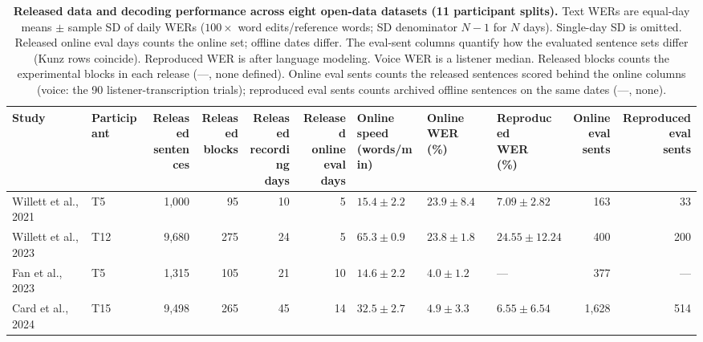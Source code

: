 \documentclass[11pt]{article}
\begin{document}
\begin{table}[t]
\centering
\footnotesize
\setlength{\tabcolsep}{3pt}
\renewcommand{\arraystretch}{1.12}
\caption{\textbf{Released data and decoding performance across eight
open-data datasets (11 participant splits).}
Text WERs are equal-day means $\pm$ sample SD of daily WERs
($100\times$ word edits/reference words; SD denominator $N-1$ for $N$ days).
Single-day SD is omitted. Released online eval days counts the online set;
offline dates differ. The eval-sent columns quantify how the evaluated sentence sets differ (Kunz rows coincide). Reproduced WER is after language modeling.
Voice WER is a listener median. Released blocks counts the experimental blocks in each release (---, none defined). Online eval sents counts the released sentences scored behind the online columns (voice: the 90 listener-transcription trials); reproduced eval sents counts archived offline sentences on the same dates (---, none).}
\label{tab:repro}
\begin{tabular}{@{}>{\raggedright\arraybackslash}p{3.50cm}lrrrrlllrr@{}}
\toprule
Study & Participant & \shortstack[r]{Released\\sentences} & \shortstack[r]{Released\\blocks} & \shortstack[r]{Released\\recording\\days} & \shortstack[r]{Released\\online eval\\days} & \shortstack[l]{Online speed\\(words/min)} & \shortstack[l]{Online WER\\(\%)} & \shortstack[l]{Reproduced\\WER (\%)} & \shortstack[r]{Online eval\\sents} & \shortstack[r]{Reproduced eval\\sents} \\
\midrule
Willett et al., 2021 \cite{willett2021} & T5 & 1{,}000 & 95 & 10 & 5 & $15.4{\pm}2.2$ & $23.9{\pm}8.4$ & $7.09{\pm}2.82$ & 163 & 33 \\
Willett et al., 2023 \cite{willett2023} & T12 & 9{,}680 & 275 & 24 & 5 & $65.3{\pm}0.9$ & $23.8{\pm}1.8$ & $24.55{\pm}12.24$ & 400 & 200 \\
Fan et al., 2023 \cite{fan2023} & T5 & 1{,}315 & 105 & 21 & 10 & $14.6{\pm}2.2$ & $4.0{\pm}1.2$ & --- & 377 & --- \\
Card et al., 2024 \cite{card2024} & T15 & 9{,}498 & 265 & 45 & 14 & $32.5{\pm}2.7$ & $4.9{\pm}3.3$ & $6.55{\pm}6.54$ & 1{,}628 & 514 \\

\end{tabular}
\end{table}
\end{document}
